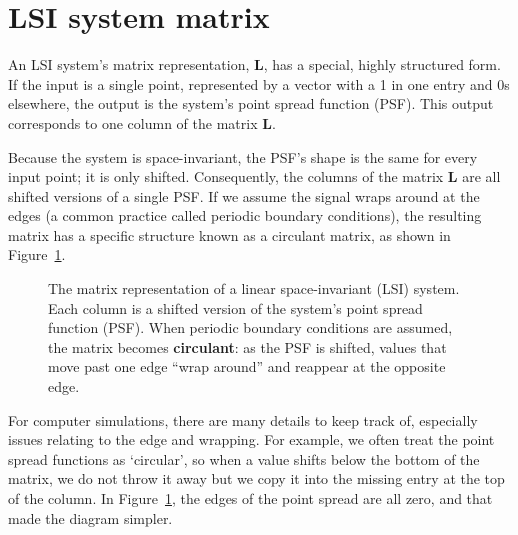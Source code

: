 \documentclass[
  letterpaper,
]{book}
\begin{document}
\section{LSI system matrix}\label{lsi-system-matrix}

An LSI system's matrix representation, \(\mathbf{L}\), has a special,
highly structured form. If the input is a single point, represented by a
vector with a 1 in one entry and 0s elsewhere, the output is the
system's point spread function (PSF). This output corresponds to one
column of the matrix \(\mathbf{L}\).

Because the system is space-invariant, the PSF's shape is the same for
every input point; it is only shifted. Consequently, the columns of the
matrix \(\mathbf{L}\) are all shifted versions of a single PSF. If we
assume the signal wraps around at the edges (a common practice called
periodic boundary conditions), the resulting matrix has a specific
structure known as a circulant matrix, as shown in
Figure~\ref{fig-ls-circulant-matrix}.

\begin{figure}


\caption{\label{fig-ls-circulant-matrix}The matrix representation of a
linear space-invariant (LSI) system. Each column is a shifted version of
the system's point spread function (PSF). When periodic boundary
conditions are assumed, the matrix becomes \textbf{circulant}: as the
PSF is shifted, values that move past one edge ``wrap around'' and
reappear at the opposite edge.}

\end{figure}%

For computer simulations, there are many details to keep track of,
especially issues relating to the edge and wrapping. For example, we
often treat the point spread functions as `circular', so when a value
shifts below the bottom of the matrix, we do not throw it away but we
copy it into the missing entry at the top of the column. In
Figure~\ref{fig-ls-circulant-matrix}, the edges of the point spread are
all zero, and that made the diagram simpler.
\end{document}
